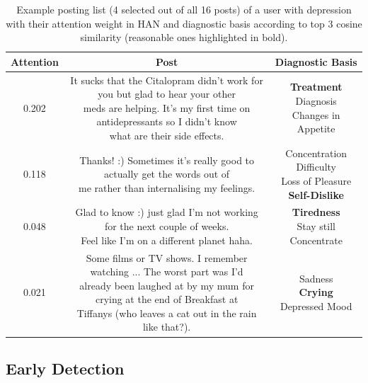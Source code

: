 \begin{table}[t]
    \centering
	\small
    \begin{tabular}{ccc}
        \hline
        Attention & Post & Diagnostic Basis \\
        \hline
        0.202 & \makecell[l]{It sucks that the Citalopram didn't work for you but glad to hear your other \\ meds are helping. It's my first time on antidepressants so I didn't know \\ what are their side effects.} & \makecell[c]{\textbf{Treatment} \\ Diagnosis \\ Changes in Appetite }\\
        \hline
        0.118 & \makecell[l]{Thanks! :) Sometimes it's really good to actually get the words out of  \\ me rather than internalising my feelings.} & \makecell[c]{Concentration Difficulty \\ Loss of Pleasure \\ \textbf{Self-Dislike}}\\
        \hline
        0.048 & \makecell[l]{Glad to know :) just glad I'm not working for the next couple of weeks. \\ Feel like I'm on a different planet haha.} & \makecell[c]{\textbf{Tiredness} \\ Stay still \\ Concentrate} \\
        \hline
        0.021 & \makecell[l]{Some films or TV shows. I remember watching ... The worst part was I'd  \\ already been laughed at by my mum for crying at the end of Breakfast at \\ Tiffanys (who leaves a cat out in the rain like that?). } & \makecell[c]{Sadness \\ \textbf{Crying} \\ Depressed Mood} \\
        \hline
        \end{tabular}
        \caption{\label{table:example} Example posting list (4 selected out of all 16 posts) of a user with depression with their attention weight in HAN and diagnostic basis according to top 3 cosine similarity (reasonable ones highlighted in bold).}
\end{table}


\subsection{Early Detection}

